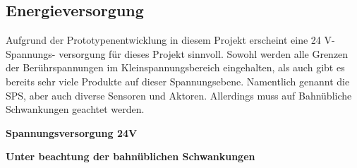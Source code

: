 \subsection{Energieversorgung}\label{sec:EV}
Aufgrund der Prototypenentwicklung in diesem Projekt erscheint eine 24 V-Spannungs- versorgung für dieses Projekt sinnvoll. Sowohl werden alle Grenzen der Berührspannungen im Kleinspannungsbereich eingehalten, als auch gibt es bereits sehr viele Produkte auf dieser Spannungsebene. Namentlich genannt die SPS, aber auch diverse Sensoren und Aktoren. Allerdings muss auf Bahnübliche Schwankungen geachtet werden.\par
\begin{feat}
\textbf{Spannungsversorgung 24V}
\end{feat}
\begin{rem}
\textbf{Unter beachtung der bahnüblichen Schwankungen}
\end{rem}

